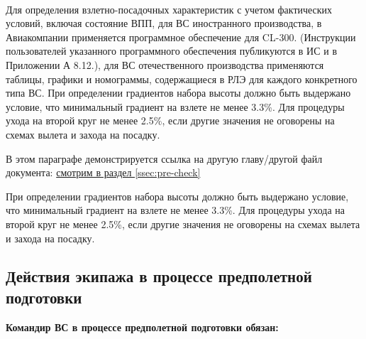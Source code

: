 \paragraph{} Для определения взлетно-посадочных характеристик с учетом фактических условий, включая состояние ВПП, для ВС иностранного производства, в Авиакомпании применяется программное обеспечение для CL-300. (Инструкции пользователей указанного программного обеспечения публикуются в ИС и в Приложении А 8.12.), для ВС отечественного производства применяются таблицы, графики и номограммы, содержащиеся в РЛЭ для каждого конкретного типа ВС.
При определении градиентов набора высоты должно быть выдержано условие, что минимальный градиент на взлете не менее 3.3\%. Для процедуры ухода на второй круг не менее 2.5\%, если другие значения не оговорены на схемах вылета и захода на посадку. 

\textcolor[rgb]{1,0,0}{В этом параграфе демонстрируется ссылка на другую главу/другой файл документа:}
\hyperref[ssec:pre-check]{смотрим в раздел \ref*{ssec:pre-check}}

При определении градиентов набора высоты должно быть выдержано условие, что минимальный градиент на взлете не менее 3.3\%. Для процедуры ухода на второй круг не менее 2.5\%, если другие значения не оговорены на схемах вылета и захода на посадку. 

\subsection{Действия экипажа в процессе предполетной подготовки}


\textbf{Командир ВС в процессе предполетной подготовки обязан:}



